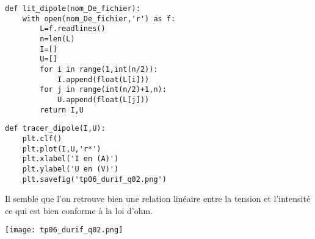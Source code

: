 \question{}

\begin{lstlisting}
def lit_dipole(nom_De_fichier):
    with open(nom_De_fichier,'r') as f:
        L=f.readlines()
        n=len(L)
        I=[]
        U=[]
        for i in range(1,int(n/2)):
            I.append(float(L[i]))
        for j in range(int(n/2)+1,n):
            U.append(float(L[j]))
        return I,U
\end{lstlisting}

\question{}

\begin{lstlisting}
def tracer_dipole(I,U):
    plt.clf()
    plt.plot(I,U,'r*')
    plt.xlabel('I en (A)')
    plt.ylabel('U en (V)')
    plt.savefig('tp06_durif_q02.png')
\end{lstlisting}



\question{}

Il semble que l'on retrouve bien une relation linéaire entre la tension et l'intensité ce qui est bien conforme à la loi d'ohm.
\begin{center}
\texttt{[image: tp06\_durif\_q02.png]}
\end{center}